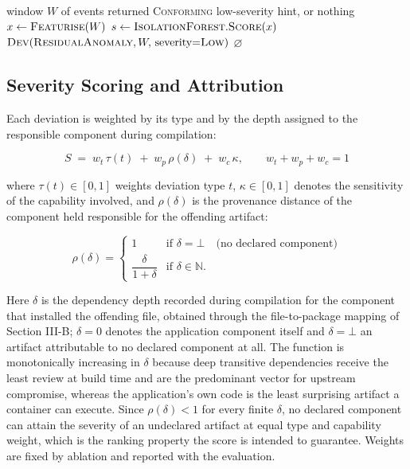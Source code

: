 \documentclass[conference]{IEEEtran}
\begin{document}
\begin{algorithm}[!t]
\footnotesize
\caption{Residual Screening (per conforming event window)}
\label{alg:residual}
\begin{algorithmic}[1]
\Require window $W$ of events returned \textsc{Conforming}
\Ensure low-severity hint, or nothing
\State $x \gets \textsc{Featurise}(W)$
\State $s \gets \textsc{IsolationForest}.\textsc{Score}(x)$
  \State \Return $\textsc{Dev}(\textsc{ResidualAnomaly}, W,\,
                 \text{severity}{=}\textsc{Low})$
\EndIf
\State \Return $\varnothing$
\end{algorithmic}
\end{algorithm}

\subsection{Severity Scoring and Attribution}

Each deviation is weighted by its type and by the depth assigned to the
responsible component during compilation:

\begin{equation}
S \;=\; w_{t}\,\tau(t) \;+\; w_{p}\,\rho(\delta) \;+\; w_{c}\,\kappa,
\qquad w_{t}+w_{p}+w_{c}=1
\end{equation}

\noindent where $\tau(t)\in[0,1]$ weights deviation type $t$,
$\kappa\in[0,1]$ denotes the sensitivity of the capability involved,
and $\rho(\delta)$ is the provenance distance of the component held
responsible for the offending artifact:

\begin{equation}
\rho(\delta) =
\begin{cases}
1 & \text{if } \delta = \bot \quad \text{(no declared component)}\\[4pt]
\dfrac{\delta}{1+\delta} & \text{if } \delta \in \mathbb{N}.
\end{cases}
\end{equation}

Here $\delta$ is the dependency depth recorded during compilation for
the component that installed the offending file, obtained through the
file-to-package mapping of Section III-B; $\delta = 0$ denotes the
application component itself and $\delta = \bot$ an artifact
attributable to no declared component at all. The function is
monotonically increasing in $\delta$ because deep transitive
dependencies receive the least review at build time and are the
predominant vector for upstream compromise, whereas the application's
own code is the least surprising artifact a container can execute.
Since $\rho(\delta) < 1$ for every finite $\delta$, no declared
component can attain the severity of an undeclared artifact at equal
type and capability weight, which is the ranking property the score is
intended to guarantee. Weights are fixed by ablation and reported with
the evaluation.
\end{document}
